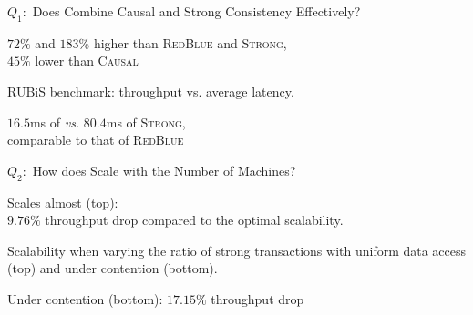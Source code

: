 
\begin{frame}{$Q_{1}:$ Does \unistore{} Combine Causal and Strong Consistency Effectively?}
  \begin{center}
    { $72\%$ and $183\%$ higher than \textsc{RedBlue} and \textsc{Strong}, \\[3pt]
      $45\%$ lower than \textsc{Causal}}

    \vspace{-0.20cm}
    {\footnotesize RUBiS benchmark: throughput vs. average latency.}

    \vspace{0.50cm}
    { $16.5$ms of \unistore{} \emph{vs.} $80.4$ms of \textsc{Strong}, \\[3pt]
      comparable to that of \textsc{RedBlue}}
  \end{center}
\end{frame}

\begin{frame}{$Q_{2}:$ How does \unistore{} Scale with the Number of Machines?}
  \begin{center}
    {Scales almost  (top): \\[3pt]
      $9.76\%$ throughput drop compared to the optimal scalability.
    }

    \vspace{0.30cm}
    \vspace{-0.20cm}
    {\footnotesize Scalability when varying the ratio of strong transactions
      with uniform data access (top) and under contention (bottom).}

    \vspace{0.30cm}
    {Under contention (bottom): $17.15\%$ throughput drop}
  \end{center}
\end{frame}

